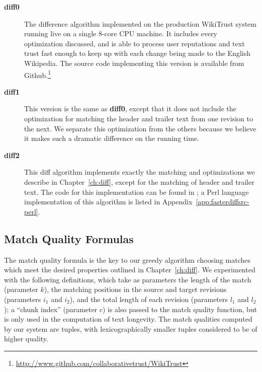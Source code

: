 \begin{description}

\item[\textbf{diff0}] The difference algorithm implemented on the production
    WikiTrust system running live on a single 8-core CPU machine.
    It includes every optimization discussed,
    and is able to process user reputations and text trust fast enough
    to keep up with each change being made to the English Wikipedia.
    The source code implementing this version is available from
    Github.\footnote{\url{http://www.github.com/collaborativetrust/WikiTrust}}

\item[\textbf{diff1}] This version is the same as \textbf{diff0},
    except that it does not include the optimization for matching
    the header and trailer text from one revision to the next.
    We separate this optimization from the others because we believe
    it makes such a dramatic difference on the running time.

\item[\textbf{diff2}] This diff algorithm implements exactly the matching
    and optimizations we describe in Chapter~\ref{ch:diff}, except
    for the matching of header and trailer text.
    The code for this implementation can be found in
    ; a Perl language implementation of
    this algorithm is listed in Appendix~\ref{app:fasterdiffsrc-perl}.

\end{description}



\subsection{Match Quality Formulas}

The match quality formula is the key to our greedy algorithm
choosing matches which meet the desired properties outlined
in Chapter~\ref{ch:diff}.
We experimented with the following  definitions,
which take as parameters the length of the match (parameter $k$),
the matching positions in the source and target revisions
(parameters $i_1$ and $i_2$), and the total length of
each revision (parameters $l_1$ and $l_2$);
a ``chunk index'' (parameter $c$) is also passed to the
match quality function, but is only used in the computation
of text longevity.
The match qualities computed by our system are tuples,
with lexicographically smaller tuples considered to be
of higher quality.

